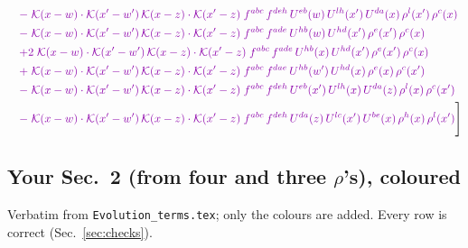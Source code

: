 \documentclass[10pt]{article}
\numberwithin{equation}{section}
\begin{document}
\begin{align}
&\quad{\color{CC}-\;\mathcal{K}(x-w)\cdot\mathcal{K}(x'-w')\,\mathcal{K}(x-z)\cdot\mathcal{K}(x'-z)\;f^{abc}\,f^{deh}\,U^{eb}(w)\,U^{lh}(x')\,U^{da}(x)\,\rho^{l}(x')\,\rho^{c}(x)}\notag\\
&\quad{\color{CC}-\;\mathcal{K}(x-w)\cdot\mathcal{K}(x'-w')\,\mathcal{K}(x-z)\cdot\mathcal{K}(x'-z)\;f^{abc}\,f^{ade}\,U^{hb}(w)\,U^{hd}(x')\,\rho^{e}(x')\,\rho^{c}(x)}\notag\\
&\quad{\color{CC}+2\;\mathcal{K}(x-w)\cdot\mathcal{K}(x'-w')\,\mathcal{K}(x-z)\cdot\mathcal{K}(x'-z)\;f^{abc}\,f^{ade}\,U^{hb}(x)\,U^{hd}(x')\,\rho^{e}(x')\,\rho^{c}(x)}\notag\\
&\quad{\color{CC}+\;\mathcal{K}(x-w)\cdot\mathcal{K}(x'-w')\,\mathcal{K}(x-z)\cdot\mathcal{K}(x'-z)\;f^{abc}\,f^{dae}\,U^{hb}(w')\,U^{hd}(x)\,\rho^{e}(x)\,\rho^{c}(x')}\notag\\
&\quad{\color{CC}-\;\mathcal{K}(x-w)\cdot\mathcal{K}(x'-w')\,\mathcal{K}(x-z)\cdot\mathcal{K}(x'-z)\;f^{abc}\,f^{deh}\,U^{eb}(x')\,U^{lh}(x)\,U^{da}(z)\,\rho^{l}(x)\,\rho^{c}(x')}\notag\\
&\quad{\color{CC}-\;\mathcal{K}(x-w)\cdot\mathcal{K}(x'-w')\,\mathcal{K}(x-z)\cdot\mathcal{K}(x'-z)\;f^{abc}\,f^{deh}\,U^{da}(z)\,U^{lc}(x')\,U^{be}(x)\,\rho^{h}(x)\,\rho^{l}(x')}\Bigg]\label{eq:fourlists}
\end{align}

\subsection{Your Sec.~2 (from four and three $\rho$'s), coloured}
Verbatim from \texttt{Evolution\_terms.tex}; only the colours are added. Every row is correct (Sec.~\ref{sec:checks}).
\end{document}

